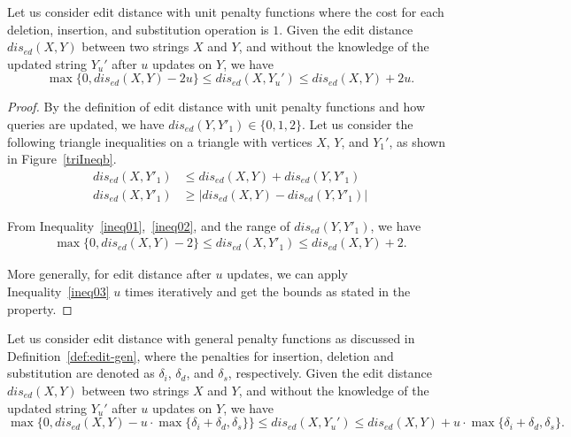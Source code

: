 \begin{property}\label{ppt:bound-ed}
Let us consider edit distance with unit penalty functions where the cost for each deletion, insertion, and substitution operation is $1$. Given the edit distance $dis_{ed}(X, Y)$ between two strings $X$ and $Y$, and without the knowledge of the updated string $Y_u'$ after $u$ updates on $Y$, we have 
$$\max\{0, dis_{ed}(X, Y) - 2u\} \leq dis_{ed}(X, Y_u') \leq dis_{ed}(X, Y) + 2u.$$

\end{property}

\begin{proof}
By the definition of edit distance with unit penalty functions and how queries are updated, we have $dis_{ed}(Y, Y'_1)\in \{0,1,2\}$. Let us consider the following triangle inequalities on a triangle with vertices $X$, $Y$, and $Y_1'$, as shown in Figure~\ref{triIneqb}. 
\begin{align}
dis_{ed}(X, Y'_1) &\leq dis_{ed}(X, Y) + dis_{ed}(Y, Y'_1) \label{ineq01}\\
dis_{ed}(X, Y'_1) &\geq |dis_{ed}(X, Y)-dis_{ed}(Y, Y'_1)| \label{ineq02}
\end{align}

From Inequality~\ref{ineq01},~\ref{ineq02}, and the range of $dis_{ed}(Y, Y'_1)$, we have 
\begin{align}\label{ineq03}
\max\{0, dis_{ed}(X, Y) - 2\} \leq dis_{ed}(X, Y'_1) \leq dis_{ed}(X, Y) + 2.
\end{align}

More generally, for edit distance after $u$ updates, we can apply Inequality~\ref{ineq03} $u$ times iteratively and get the bounds as stated in the property.
\end{proof}

\begin{property}\label{ppt:bound-ed-gen}
Let us consider edit distance with general penalty functions as discussed in Definition~\ref{def:edit-gen}, where the penalties for insertion, deletion and substitution are denoted as $\delta_i$, $\delta_d$, and $\delta_s$, respectively.  Given the edit distance $dis_{ed}(X, Y)$ between two strings $X$ and $Y$, and without the knowledge of the updated string $Y_u'$ after $u$ updates on $Y$, we have 
$$\max\{0, dis_{ed}(X, Y) - u \cdot \max\{\delta_i + \delta_d, \delta_s\} \} \leq dis_{ed}(X, Y_u') \leq dis_{ed}(X, Y) + u \cdot \max\{\delta_i+\delta_d, \delta_s\}\text{.}$$
\end{property}

